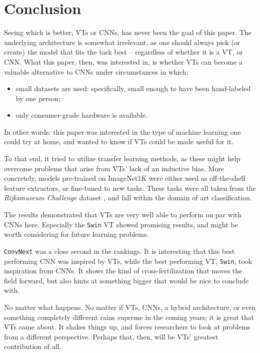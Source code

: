 \section{Conclusion}
Seeing which is better, VTs or CNNs, has never been the goal of this paper. The underlying architecture is somewhat irrelevant, as one should always pick (or create) the model that fits the task best -- regardless of whether it is a VT, or CNN. What this paper, then, was interested in, is whether VTs can become a valuable alternative to CNNs under circumstances in which:
\begin{itemize}
\item small datasets are used: specifically, small enough to have been hand-labeled by one person;
\item only consumer-grade hardware is available.
\end{itemize}
In other words: this paper was interested in the type of machine learning one could try at home, and wanted to know if VTs could be made useful for it.

To that end, it tried to utilize transfer learning methods, as these might help overcome problems that arise from VTs' lack of an inductive bias. More concretely, models pre-trained on ImageNet1K were either used as off-the-shelf feature extractors, or fine-tuned to new tasks. These tasks were all taken from the \textit{Rijksmuseum Challenge} dataset \citep{mensink14icmr}, and fall within the domain of art classification.

The results demonstrated that VTs are very well able to perform on par with CNNs here. Especially the \texttt{Swin} VT showed promising results, and might be worth considering for future learning problems.

\texttt{ConvNext} was a close second in the rankings. It is interesting that this best performing CNN was inspired by VTs, while the best performing VT, \texttt{Swin}, took inspiration from CNNs. It shows the kind of cross-fertilization that moves the field forward, but also hints at something bigger that would be nice to conclude with.

No matter what happens. No matter if VTs, CNNs, a hybrid architecture, or even something completely different rains supreme in the coming years; it is great that VTs came about. It shakes things up, and forces researchers to look at problems from a different perspective. Perhaps that, then, will be VTs' greatest contribution of all.
